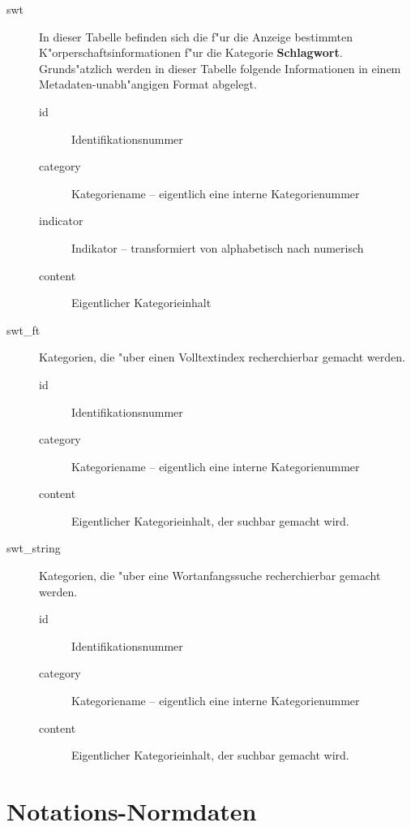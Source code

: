 \documentclass[11pt, twoside, a4paper, BCOR8mm, DIV12, bibtotoc,idxtotoc]{scrbook}
\begin{document}
\begin{description}
\item[swt] In dieser Tabelle befinden sich die f"ur die Anzeige
  bestimmten K"orperschaftsinformationen f"ur die Kategorie
  \textbf{Schlagwort}. Grunds"atzlich werden in dieser Tabelle
  folgende Informationen in einem Metadaten-unabh"angigen Format
  abgelegt.
  \begin{description}
  \item[id] Identifikationsnummer
  \item[category] Kategoriename -- eigentlich eine interne Kategorienummer
  \item[indicator] Indikator -- transformiert von alphabetisch nach numerisch
  \item[content] Eigentlicher Kategorieinhalt
  \end{description}
\item[swt\_ft] Kategorien, die "uber einen Volltextindex recherchierbar
  gemacht werden.
  \begin{description}
  \item[id] Identifikationsnummer
  \item[category] Kategoriename -- eigentlich eine interne Kategorienummer
  \item[content] Eigentlicher Kategorieinhalt, der suchbar gemacht wird.
  \end{description}
\item[swt\_string] Kategorien, die "uber eine Wortanfangssuche
  recherchierbar gemacht werden.
  \begin{description}
  \item[id] Identifikationsnummer
  \item[category] Kategoriename -- eigentlich eine interne Kategorienummer
  \item[content] Eigentlicher Kategorieinhalt, der suchbar gemacht wird.
  \end{description}
\end{description}

\section{Notations-Normdaten}
\end{document}
